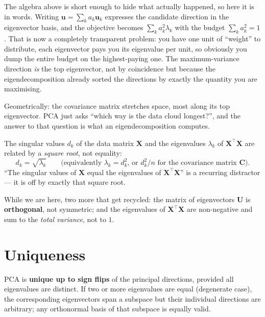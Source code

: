 \documentclass[11pt, oneside]{book}
\newcommand{\T}{^{\top}}
\begin{document}
\begin{intbox}[title={Why eigenvectors, of all things?}]
The algebra above is short enough to hide what actually happened, so here it is in
words.
Writing $\bm{u} = \sum_k a_k\bm{u}_k$ expresses the candidate direction in the
eigenvector basis, and the objective becomes $\sum_k a_k^2\lambda_k$ with the
budget $\sum_k a_k^2 = 1$.
That is now a completely transparent problem: you have one unit of ``weight'' to
distribute, each eigenvector pays you its eigenvalue per unit, so obviously you
dump the entire budget on the highest-paying one.
The maximum-variance direction \emph{is} the top eigenvector, not by coincidence
but because the eigendecomposition already sorted the directions by exactly the
quantity you are maximising.

Geometrically: the covariance matrix stretches space, most along its top
eigenvector.
PCA just asks ``which way is the data cloud longest?'', and the answer to that
question is what an eigendecomposition computes.
\end{intbox}

\begin{notebox}[title={Exam trap: singular values are not eigenvalues}]
The singular values $d_k$ of the data matrix $\bm{X}$ and the eigenvalues
$\lambda_k$ of $\bm{X}\T\bm{X}$ are related by a \emph{square root}, not equality:
\[
  d_k = \sqrt{\lambda_k}
  \qquad\text{(equivalently } \lambda_k = d_k^2\text{, or } d_k^2/n \text{ for the
  covariance matrix }\bm{C}\text{).}
\]
``The singular values of $\bm{X}$ equal the eigenvalues of $\bm{X}\T\bm{X}$'' is a
recurring distractor --- it is off by exactly that square root.

While we are here, two more that get recycled: the matrix of eigenvectors $\bm{U}$
is \textbf{orthogonal}, not symmetric; and the eigenvalues of $\bm{X}\T\bm{X}$ are
non-negative and sum to the \emph{total variance}, not to $1$.
\end{notebox}


\section{Uniqueness}

PCA is \textbf{unique up to sign flips} of the principal directions, provided all
eigenvalues are distinct.
If two or more eigenvalues are equal (degenerate case), the corresponding eigenvectors
span a subspace but their individual directions are arbitrary; any orthonormal basis
of that subspace is equally valid.
\end{document}
